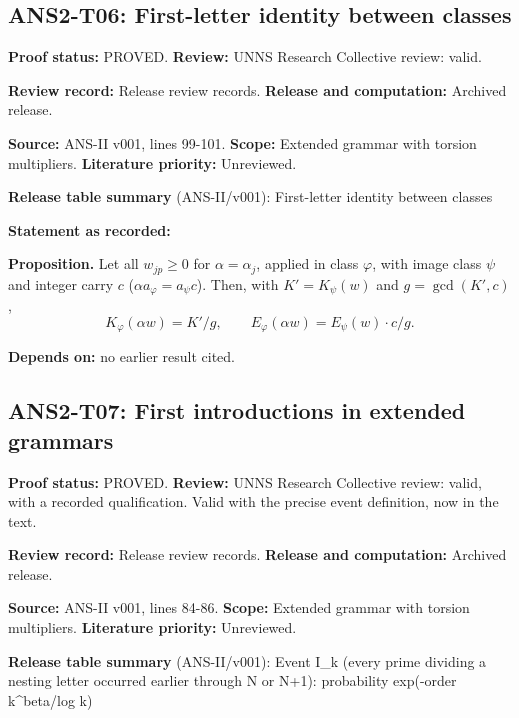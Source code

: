 \documentclass[
  11pt,
]{article}
\begin{document}
\hypertarget{ans2-t06-first-letter-identity-between-classes}{%
\subsection{ANS2-T06: First-letter identity between
classes}\label{ans2-t06-first-letter-identity-between-classes}}

\textbf{Proof status:} PROVED. \textbf{Review:} UNNS Research Collective
review: valid.

\textbf{Review record:} Release review records. \textbf{Release and
computation:} Archived release.

\textbf{Source:} ANS-II v001, lines 99-101. \textbf{Scope:} Extended
grammar with torsion multipliers. \textbf{Literature priority:}
Unreviewed.

\textbf{Release table summary} (ANS-II/v001): First-letter identity
between classes

\textbf{Statement as recorded:}

\textbf{Proposition.} Let all \(w_{jp}\ge0\) for \(\alpha=\alpha_j\),
applied in class \(\varphi\), with image class \(\psi\) and integer
carry \(c\) (\(\alpha a_\varphi=a_\psi c\)). Then, with \(K'=K_\psi(w)\)
and \(g=\gcd(K',c)\),
\[K_\varphi(\alpha w)=K'/g,\qquad E_\varphi(\alpha w)=E_\psi(w)\cdot c/g .\]

\textbf{Depends on:} no earlier result cited.

\hypertarget{ans2-t07-first-introductions-in-extended-grammars}{%
\subsection{ANS2-T07: First introductions in extended
grammars}\label{ans2-t07-first-introductions-in-extended-grammars}}

\textbf{Proof status:} PROVED. \textbf{Review:} UNNS Research Collective
review: valid, with a recorded qualification. Valid with the precise
event definition, now in the text.

\textbf{Review record:} Release review records. \textbf{Release and
computation:} Archived release.

\textbf{Source:} ANS-II v001, lines 84-86. \textbf{Scope:} Extended
grammar with torsion multipliers. \textbf{Literature priority:}
Unreviewed.

\textbf{Release table summary} (ANS-II/v001): Event I\_k (every prime
dividing a nesting letter occurred earlier through N or N+1):
probability exp(-order k\^{}beta/log k)
\end{document}
